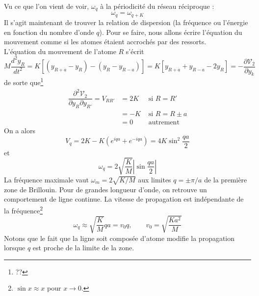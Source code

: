 Vu ce que l'on vient de voir, $\omega_q$ à la périodicité du réseau 
réciproque :
\begin{equation}
\omega_q = \omega_{q+K}
\end{equation}
Il s'agit maintenant de trouver la relation de dispersion (la fréquence 
ou l'énergie en fonction du nombre d'onde $q$). Pour se faire, nous allons 
écrire l'équation du mouvement comme si les atomes étaient accrochés par 
des ressorts. \\
L'équation du mouvement de l'atome $R$ s'écrit
\begin{equation}
M \dfrac{d^2y_R}{dt^2} = K[(y_{R+a}-y_R)-(y_R-y_{R-a})] = K[y_{R+a}+y_{R-a}
-2y_R] = -\dfrac{\partial \mathcal{V}_2}{\partial y_k}
\end{equation}
de sorte que\footnote{??}
\begin{equation}
\begin{array}{lll}
\dfrac{\partial^2\mathcal{V}_2}{\partial y_R\partial y_{R'}} = V_{RR'} &= 2K
& \text{ si } R = R'\\
&= -K & \text{ si } R = R\pm a\\
&= 0 & \text{ autrement }
\end{array}
\end{equation}
On a alors
\begin{equation}
V_q = 2K-K(e^{iqa}+e^{-iqa}) = 4K\sin^2\dfrac{qa}{2}
\end{equation}
et 
\begin{equation}
\omega_q = 2\sqrt{\dfrac{K}{M}}|\sin\dfrac{qa}{2}|
\end{equation}
La fréquence maximale vaut $\omega_m = 2\sqrt{K/M}$ aux limites $q=\pm\pi/a$ 
de la première zone de Brillouin. Pour de grandes longueur d'onde, on retrouve 
un comportement de ligne continue. La vitesse de propagation est indépendante 
de la fréquence\footnote{$\sin x \approx x$ pour $x\rightarrow 0$.}
\begin{equation}
\omega_q \approx \sqrt{\dfrac{K}{M}}qa = v_0q,\qquad v_0 = \sqrt{\dfrac{Ka^2
}{M}}
\end{equation}
Notons que le fait que la ligne soit composée d'atome modifie la propagation 
lorsque $q$ est proche de la limite de la zone.


